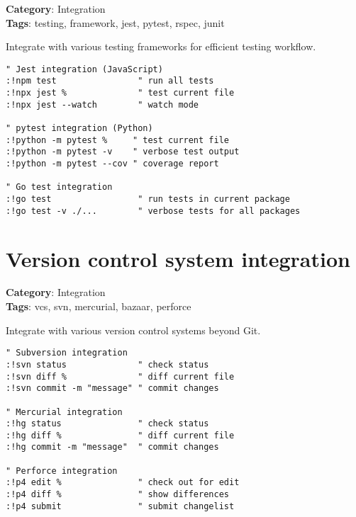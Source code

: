 {{{{{{\textbf{Category}: Integration\\ \textbf{Tags}: testing, framework, jest, pytest, rspec, junit
\vspace{0.5cm}

Integrate with various testing frameworks for efficient testing workflow.

\begin{Exa*}{}
\begin{Verbatim}[fontsize=\footnotesize, breaklines, breakanywhere]
" Jest integration (JavaScript)
:!npm test                " run all tests
:!npx jest %              " test current file
:!npx jest --watch        " watch mode

" pytest integration (Python)
:!python -m pytest %     " test current file
:!python -m pytest -v    " verbose test output
:!python -m pytest --cov " coverage report

" Go test integration
:!go test                 " run tests in current package
:!go test -v ./...        " verbose tests for all packages
\end{Verbatim}
\end{Exa*}

\section{Version control system integration}

\textbf{Category}: Integration\\ \textbf{Tags}: vcs, svn, mercurial, bazaar, perforce
\vspace{0.5cm}

Integrate with various version control systems beyond Git.

\begin{Exa*}{}
\begin{Verbatim}[fontsize=\footnotesize, breaklines, breakanywhere]
" Subversion integration
:!svn status              " check status
:!svn diff %              " diff current file
:!svn commit -m "message" " commit changes

" Mercurial integration
:!hg status               " check status
:!hg diff %               " diff current file
:!hg commit -m "message"  " commit changes

" Perforce integration
:!p4 edit %               " check out for edit
:!p4 diff %               " show differences
:!p4 submit               " submit changelist
\end{Verbatim}
\end{Exa*}

}}}}}}

